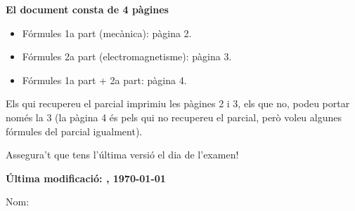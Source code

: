 \documentclass[12pt,a4paper]{article}
\begin{document}
\vspace*{\fill}
\begin{center}
     \Huge {\bf El document consta de 4 pàgines}
\end{center}

\quad

{\Large 
    \begin{addmargin}[10em]{0em}
        \begin{itemize}
            \item Fórmules 1a part (mecànica): pàgina 2.
            \item Fórmules 2a part (electromagnetisme): pàgina 3.
            \item Fórmules 1a part + 2a part: pàgina 4.
        \end{itemize}
    \end{addmargin}
    
    \quad
    
    \begin{addmargin}[8em]{8em}
    Els qui recupereu el parcial imprimiu les pàgines 2 i 3, els que no, podeu portar només la 3 (la pàgina 4 és pels qui no recupereu el parcial, però voleu algunes fórmules del parcial igualment).
    
    \quad
    
    Assegura't que tens l'última versió el dia de l'examen!
    
    \quad
    
    \begin{flushright}
        {\bf Última modificació: \currenttime, \today}
    \end{flushright}
    
    \end{addmargin}
}
\vspace*{\fill}

\newpage

\raggedright
\begin{multicols}{4}
{\fontsize{12}{12}\selectfont
}
\newpage
\end{multicols}

\begin{multicols}{3}


\vspace{15pt}
\raggedleft
{\Large Nom: \underline{\hspace{6cm}}}
\end{multicols}


\end{document}
